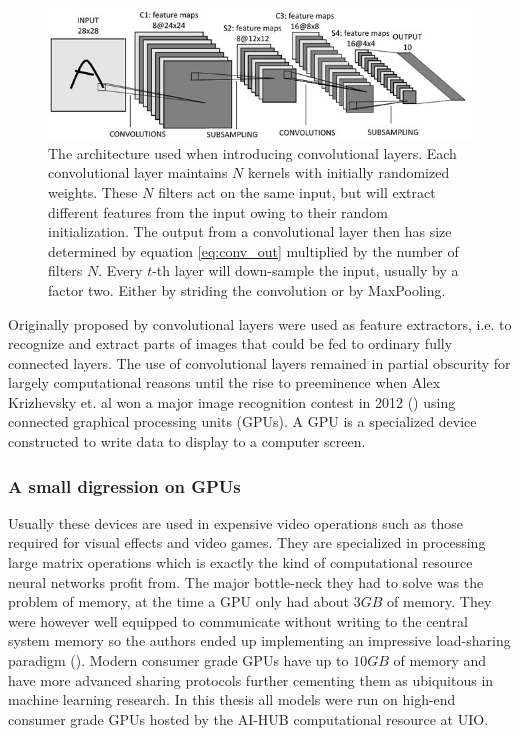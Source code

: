 \begin{figure}
\centering
\includegraphics[width=\textwidth]{../figures/lenet5}
\caption[Original LeNet architecture]{The architecture \citet{Lecun1998} used when introducing convolutional layers. Each convolutional layer maintains $N$ kernels with initially randomized weights. These $N$ filters act on the same input, but will extract different features from the input owing to their random initialization. The output from a convolutional layer then has size determined by equation \ref{eq:conv_out} multiplied by the number of filters $N$. Every $t$-th layer will down-sample the input, usually by a factor two. Either by striding the convolution or by MaxPooling.}\label{fig:lenet5}
\end{figure}

Originally proposed by \citet{Lecun1998} convolutional layers were used as feature extractors, i.e. to recognize and extract parts of images that could be fed to ordinary fully connected layers. The use of convolutional layers remained in partial obscurity for largely computational reasons until the rise to preeminence when Alex Krizhevsky et. al won a major image recognition contest in 2012 (\cite{Krizhevsky2012}) using connected graphical processing units (GPUs). A GPU is a specialized device constructed to write data to display to a computer screen. 

\subsubsection{A small digression on GPUs}
Usually these devices are used in expensive video operations such as those required for visual effects and video games. They are specialized in processing large matrix operations which is exactly the kind of computational resource neural networks profit from. The major bottle-neck they had to solve was the problem of memory, at the time a GPU only had about $3 GB$ of memory. They were however well equipped to communicate without writing to the central system memory so the authors ended up implementing an impressive load-sharing paradigm (\cite{Krizhevsky2012}). Modern consumer grade GPUs have up to $10 GB$ of memory and have more advanced sharing protocols further cementing them as ubiquitous in machine learning research. In this thesis all models were run on high-end consumer grade GPUs hosted by the AI-HUB computational resource at UIO.

